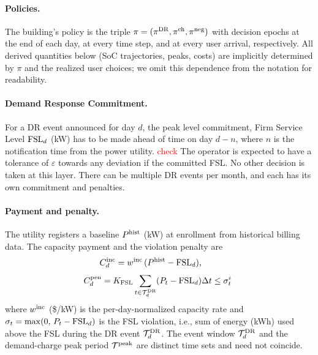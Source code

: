 \paragraph{Policies.} The building's policy is the triple $\pi =
(\pi^{\mathrm{DR}}, \pi^{\mathrm{ch}}, \pi^{\mathrm{neg}})$ with decision epochs at the end of each day, at every time step, and at every user arrival, respectively. All derived quantities below (SoC trajectories, peaks, costs) are implicitly determined by $\pi$ and the realized user choices; we omit this dependence from the notation for readability.


\paragraph{Demand Response Commitment.} For a DR event announced for day $d$, the peak level commitment, Firm Service Level $\mathrm{FSL}_d$ (kW) has to be made ahead of time on day $d{-}n$, where $n$ is the notification time from the power utility. \textcolor{red}{check} The operator is expected to have a tolerance of $\varepsilon$ towards any deviation if the committed FSL. No other decision is taken at this layer. There can be multiple DR events per month, and each has its own commitment and penalties.

\paragraph{Payment and penalty.} The utility registers a baseline
$P^{\mathrm{hist}}$ (kW) at enrollment from historical billing data. The capacity payment and the violation penalty are
\begin{equation}\label{eq:dr}
C_{d}^{\mathrm{inc}} = w^{\mathrm{inc}}\,(P^{\mathrm{hist}} - \mathrm{FSL}_d), \qquad
\end{equation}
\begin{equation}
\Cpen{d} = \Kfsl \sum_{t \in \evwin{d}} (P_{t} - \FSL_d) \Delta t \le \sigma^i_t\ 
\end{equation}
where $w^{\mathrm{inc}}$ (\$/kW) is the per-day-normalized capacity rate and $\sigma_{t} = \max(0,\, P_{t} - \mathrm{FSL}_d)$ is the FSL violation, i.e., sum of energy (kWh) used above the FSL during the DR event $\mathcal{T}^{\mathrm{DR}}_{d}$. The event window $\mathcal{T}^{\mathrm{DR}}_{d}$ and the demand-charge peak period $\mathcal{T}^{\mathrm{peak}}$ are distinct time sets and need not coincide.

